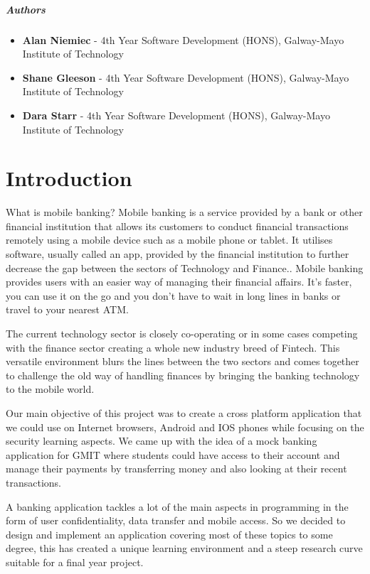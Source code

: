 \paragraph{Authors}
    \begin{itemize}
    \item \textbf{Alan Niemiec} - 4th Year Software Development (HONS), Galway-Mayo Institute of Technology
    \item \textbf{Shane Gleeson} - 4th Year Software Development (HONS), Galway-Mayo Institute of Technology
    \item \textbf{Dara Starr} - 4th Year Software Development (HONS), Galway-Mayo Institute of Technology
    \end{itemize}



\chapter{Introduction}
What is mobile banking? Mobile banking is a service provided by a bank or other financial institution that allows its customers to conduct financial transactions remotely using a mobile device such as a mobile phone or tablet\cite{mobilebankingwiki}. It utilises software, usually called an app, provided by the financial institution to further decrease the gap between the sectors of Technology and Finance.\cite{mobilebankingwiki}. Mobile banking provides users with an easier way of managing their financial affairs. It's faster, you can use it on the go and you don't have to wait in long lines in banks or travel to your nearest ATM.

The current technology sector is closely co-operating or in some cases competing with the finance sector creating a whole new industry breed of Fintech. This versatile environment blurs the lines between the two sectors and comes together to challenge the old way of handling finances by bringing the banking technology to the mobile world.\cite{fintech}

Our main objective of this project was to create a cross platform application that we could use on Internet browsers, Android and IOS phones while focusing on the security learning aspects. We came up with the idea of a mock banking application for GMIT where students could have access to their account and manage their payments by transferring money and also looking at their recent transactions.

A banking application tackles a lot of the main aspects in programming in the form of user confidentiality, data transfer and mobile access. So we decided to design and implement an application covering most of these topics to some degree, this has created a unique learning environment and a steep research curve suitable for a final year project.

